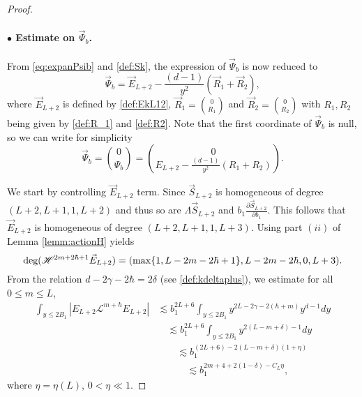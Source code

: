\documentclass[11pt]{aims}
\theoremstyle{definition}
\numberwithin{equation}{section}
\begin{document}
\begin{proof}
\paragraph{$\bullet$ Estimate on $\vec \Psi_b$.} From \eqref{eq:expanPsib} and \eqref{def:Sk}, the expression of $\vec \Psi_b$ is now reduced to 
$$\vec \Psi_b = \vec E_{L+2} - \frac{(d-1)}{y^2}(\vec R_1 + \vec R_2),$$
where $\vec E_{L+2}$ is defined by \eqref{def:EkL12}, $\vec R_1 = \binom{0}{R_1}$ and $\vec R_2 = \binom{0}{R_2}$ with $R_1, R_2$ being given by \eqref{def:R_1} and \eqref{def:R2}. Note that the first coordinate of $\vec \Psi_b$ is null, so we can write for simplicity
\begin{equation}\label{eq:formPsib}
\vec\Psi_b = \binom{0}{\Psi_b} = \binom{0}{E_{L+2}- \frac{(d-1)}{y^2}(R_1 + R_2) }.
\end{equation}

We start by controlling $\vec E_{L+2}$ term. Since $\vec S_{L+2}$ is homogeneous of degree $(L+2, L+1, 1, L+2)$ and thus so are $\Lambda \vec S_{L+2}$ and $b_1 \frac{\partial \vec S_{L+2}}{\partial b_1}$. This follows that $\vec E_{L+2}$ is homogeneous of degree $(L+2, L+1, 1, L+3)$. Using part $(ii)$ of Lemma \ref{lemm:actionH} yields 
$$\textup{deg}({\mathscr{H}}^{2m + 2\hbar +1}\vec E_{L+2}) = (\max\{1, L - 2m - 2\hbar + 1\}, L - 2m - 2\hbar, 0, L+3).$$
From the relation $d - 2\gamma - 2\hbar = 2\delta$ (see \eqref{def:kdeltaplus}), we estimate for all $0 \leq m \leq L$,
\begin{align*}
\int_{y \leq 2B_1}|E_{L+2} {\mathscr{L}}^{m + \hbar} E_{L+2}| &\lesssim b_1^{2L+6}\int_{y \leq 2B_1}y^{2L - 2\gamma - 2(\hbar + m)} y^{d-1}dy\\
&\quad\lesssim b_1^{2L+6}\int_{y \leq 2B_1}y^{2(L - m + \delta) - 1}dy\\
&\qquad \lesssim b_1^{(2L + 6) - 2(L - m + \delta)(1 + \eta)}\\
&\qquad \quad \lesssim b_1^{2m + 4 + 2(1 - \delta) - C_L\eta},
\end{align*}
where $\eta = \eta(L)$, $0 < \eta \ll 1$.


\end{proof}
\end{document}
